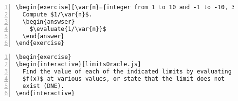 \documentclass{amsart}
\begin{document}

\begin{Verbatim}[frame=single,numbers=left]
\begin{exercise}[\var{n}={integer from 1 to 10 and -1 to -10, 3}]
  Compute $1/\var{n}$.
  \begin{answser}
    $\evaluate{1/\var{n}}$ 
  \end{answer}
\end{exercise}
\end{Verbatim}




\begin{Verbatim}[frame=single,numbers=left]
\begin{exercise}
\begin{interactive}[limitsOracle.js]
  Find the value of each of the indicated limits by evaluating
  $f(x)$ at various values, or state that the limit does not
  exist (DNE).
\end{interactive}
\end{Verbatim}
\end{document}
